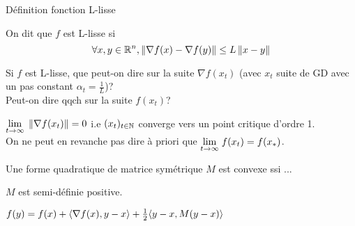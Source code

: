 \begin{note}
  \begin{field}
    Définition fonction L-lisse
  \end{field}
  \begin{field}
    On dit que $f$ est L-lisse si $$\forall x,y \in \mathbb{R}^n, \left\lVert\nabla
    f(x) - \nabla f(y)\right\rVert \leq L\left\lVert x-y\right\rVert$$
  \end{field}
  \begin{field}

  \end{field}
\end{note}

\begin{note}
  \begin{field}
    Si $f$ est L-lisse, que peut-on dire sur la suite $\nabla f(x_t)$
    (avec $x_t$ suite de GD avec un pas constant $\alpha_t=\frac{1}{L}$)?\\
    Peut-on dire qqch sur la suite $f(x_t)$?
  \end{field}
  \begin{field}
    $\underset{t\to\infty}{\lim}\;\left\lVert\nabla f(x_t)\right\rVert = 0$ i.e $(x_t)_{t\in\mathbb{N}}$ converge vers un
    point critique d'ordre 1.\\
    On ne peut en revanche pas dire à priori que $\underset{t\to\infty}{\lim}\;f(x_t)=f(x_*)$.

  \end{field}
  \begin{field}

  \end{field}
\end{note}

\begin{note}
  \begin{field}
    Une forme quadratique de matrice symétrique $M$ est convexe ssi ...
  \end{field}
  \begin{field}
    $M$ est semi-définie positive.
  \end{field}
  \begin{field}
    $f(y) = f(x) + \langle\nabla f(x),y-x\rangle + \frac{1}{2}\langle y-x,M(y-x)\rangle$
  \end{field}
\end{note}


